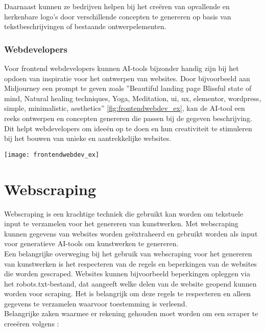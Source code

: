 Daarnaast kunnen ze bedrijven helpen bij het creëren van opvallende en herkenbare logo's door verschillende concepten te genereren op basis van tekstbeschrijvingen of bestaande ontwerpelementen. 

\subsubsection{Webdevelopers}
Voor frontend webdevelopers kunnen AI-tools bijzonder handig zijn bij het opdoen van inspiratie voor het ontwerpen van websites. Door bijvoorbeeld aan Midjourney een prompt te geven zoals ''Beautiful landing page Blissful state of mind, Natural healing techniques, Yoga, Meditation, ui, ux, elementor, wordpress, simple, minimalistic, aesthetics'' \ref{fig:frontendwebdev_ex}, kan de AI-tool een reeks ontwerpen en concepten genereren die passen bij de gegeven beschrijving. Dit helpt webdevelopers om ideeën op te doen en hun creativiteit te stimuleren bij het bouwen van unieke en aantrekkelijke websites.

\begin{center}
    \texttt{[image: frontendwebdev\_ex]}
    \label{fig:frontendwebdev_ex}
\end{center}


\section{Webscraping}
\label{ch:liter_webscraping}
Webscraping is een krachtige techniek die gebruikt kan worden om tekstuele input te verzamelen voor het genereren van kunstwerken. Met webscraping kunnen gegevens van websites worden geëxtraheerd en gebruikt worden als input voor generatieve AI-tools om kunstwerken te genereren. \\
 
Een belangrijke overweging bij het gebruik van webscraping voor het genereren van kunstwerken is het respecteren van de regels en beperkingen van de websites die worden gescraped. Websites kunnen bijvoorbeeld beperkingen opleggen via het robots.txt-bestand, dat aangeeft welke delen van de website geopend kunnen worden voor scraping. Het is belangrijk om deze regels te respecteren en alleen gegevens te verzamelen waarvoor toestemming is verleend. \\

Belangrijke zaken waarmee er rekening gehouden moet worden om een scraper te creeëren volgens \autocite{BIO2014}:


